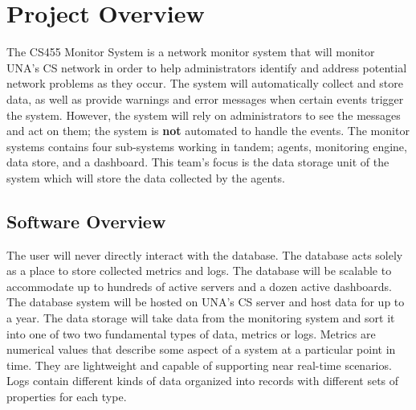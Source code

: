 \documentclass[letterpaper,12pt,oneside,listof=totoc]{scrreprt}
\begin{document}
\chapter{Project Overview} %
The CS455 Monitor System is a network monitor system that will monitor UNA's CS network in order to help administrators identify and address potential network problems as they occur. The system will automatically collect and store data, as well as provide warnings and error messages when certain events trigger the system. However, the system will rely on administrators to see the messages and act on them; the system is \textbf{not} automated to handle the events.  The monitor systems contains four sub-systems working in tandem; agents, monitoring engine, data store, and a dashboard.
This team's focus is the data storage unit of the system which will store the data collected by the agents.

\section{Software Overview} %
The user will never directly interact with the database. The database acts solely as a place to store collected metrics and logs. The database will be scalable to accommodate up to hundreds of active servers and a dozen active dashboards. The database system will be hosted on UNA's CS server and host data for up to a year. The data storage will take data from the monitoring system and sort it into one of two two fundamental types of data, metrics or logs. 
Metrics are numerical values that describe some aspect of a system at a particular point in time. They are lightweight and capable of supporting near real-time scenarios. Logs contain different kinds of data organized into records with different sets of properties for each type.

\newpage
\end{document}
